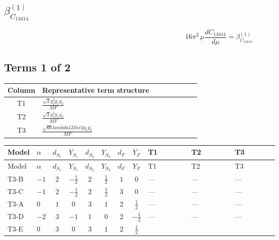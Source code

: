 \documentclass[8pt]{article}
\begin{document}
\begin{landscape}
\section*{$\beta_{C_{11614}}^{(1)}$}
\[16\pi^2\,\mu\frac{d C_{11614}}{d\mu}=\beta_{C_{11614}}^{(1)}\]
\subsection*{Terms 1 of 2}
\begin{center}
\begin{tabular}{@{}c >{\raggedright\arraybackslash}p{0.82\linewidth}@{}}
\toprule
Column & Representative term structure \\
\midrule
T1 & \(\displaystyle \frac{\sqrt{2} g_{2}^{2} \overline{y_{1}} \overline{y_{2}}}{MF}\) \\
\midrule
T2 & \(\displaystyle \frac{\sqrt{2} g_{1}^{2} \overline{y_{1}} \overline{y_{2}}}{MF}\) \\
\midrule
T3 & \(\displaystyle \frac{\sqrt{66} lambda12Inv2 \overline{y_{1}} \overline{y_{2}}}{MF}\) \\
\midrule
\bottomrule
\end{tabular}
\end{center}
\smallskip
\tiny
\begin{longtable}{@{}llcccccc >{\raggedright\arraybackslash}p{0.21\linewidth} >{\raggedright\arraybackslash}p{0.21\linewidth} >{\raggedright\arraybackslash}p{0.21\linewidth}@{}}
\toprule
Model & $\alpha$ & $d_{S_1}$ & $Y_{S_1}$ & $d_{S_2}$ & $Y_{S_2}$ & $d_F$ & $Y_F$ & T1 & T2 & T3 \\
\midrule
\endfirsthead
\toprule
Model & $\alpha$ & $d_{S_1}$ & $Y_{S_1}$ & $d_{S_2}$ & $Y_{S_2}$ & $d_F$ & $Y_F$ & T1 & T2 & T3 \\
\midrule
\endhead
T3-B & $-1$ & $2$ & $-\frac{1}{2}$ & $2$ & $\frac{1}{2}$ & $1$ & $0$ & --- & --- & --- \\
\midrule
T3-C & $-1$ & $2$ & $-\frac{1}{2}$ & $2$ & $\frac{1}{2}$ & $3$ & $0$ & --- & --- & --- \\
\midrule
T3-A & $0$ & $1$ & $0$ & $3$ & $1$ & $2$ & $\frac{1}{2}$ & --- & --- & --- \\
\midrule
T3-D & $-2$ & $3$ & $-1$ & $1$ & $0$ & $2$ & $-\frac{1}{2}$ & --- & --- & --- \\
\midrule
T3-E & $0$ & $3$ & $0$ & $3$ & $1$ & $2$ & $\frac{1}{2}$ & \scriptsize\adjustbox{max width=\linewidth}{$\begin{gathered} - \frac{33 \sqrt{2} g_{2}^{2} \overline{y_{1}} \overline{y_{2}}}{16 MF}\end{gathered}$} & \scriptsize\adjustbox{max width=\linewidth}{$\begin{gathered} - \frac{3 \sqrt{2} g_{1}^{2} \overline{y_{1}} \overline{y_{2}}}{16 MF}\end{gathered}$} & \scriptsize\adjustbox{max width=\linewidth}{$\begin{gathered} - \frac{3 \sqrt{66} lambda12Inv2 \overline{y_{1}} \overline{y_{2}}}{44 MF}\end{gathered}$} \\
\midrule
\bottomrule
\end{longtable}
\clearpage

\end{landscape}
\end{document}
